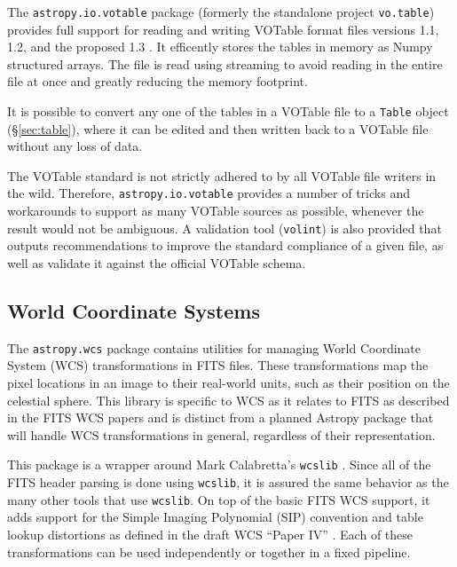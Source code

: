 \documentclass[traditabstract]{aa}
\begin{document}
\label{sec:votable}


The \texttt{astropy.io.votable} package (formerly the standalone project
\texttt{vo.table}) provides full support for reading and writing VOTable format
files versions 1.1, 1.2, and the proposed 1.3
\citep{ochsenbein2004votable,ochsenbein2009votable}. It efficently stores the
tables in memory as Numpy structured arrays. The file is read using streaming
to avoid reading in the entire file at once and greatly reducing the memory
footprint.

It is possible to convert any one of the tables in a VOTable file to a
\texttt{Table} object (\S\ref{sec:table}), where it can be edited and then
written back to a VOTable file without any loss of data.

The VOTable standard is not strictly adhered to by all VOTable file writers in
the wild. Therefore, \texttt{astropy.io.votable} provides a number of tricks
and workarounds to support as many VOTable sources as possible, whenever the
result would not be ambiguous. A validation tool (\texttt{volint}) is also
provided that outputs recommendations to improve the standard compliance of a
given file, as well as validate it against the official VOTable schema.

\subsection{World Coordinate Systems}

\label{sec:wcs}


The \texttt{astropy.wcs} package contains utilities for managing World
Coordinate System (WCS) transformations in FITS files. These transformations
map the pixel locations in an image to their real-world units, such as their
position on the celestial sphere. This library is specific to WCS as it relates
to FITS as described in the FITS WCS papers
\citep{greisen2002wcs,calabretta2002wcs,greisen2006wcs} and is distinct from a
planned Astropy package that will handle WCS transformations in general,
regardless of their representation.

This package is a wrapper around Mark Calabretta's \texttt{wcslib}
\citep{calabretta2013wcslib}. Since all of the FITS header parsing is done
using \texttt{wcslib}, it is assured the same behavior as the many other tools
that use \texttt{wcslib}. On top of the basic FITS WCS support, it adds support
for the Simple Imaging Polynomial (SIP) convention and table lookup distortions
as defined in the draft WCS ``Paper IV'' \citep{calabretta2004wcs}. Each of
these transformations can be used independently or together in a fixed
pipeline.
\end{document}
